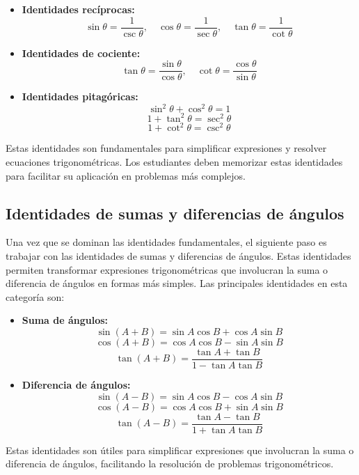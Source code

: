 \begin{itemize}
    \item \textbf{Identidades recíprocas:}
    \[
    \sin \theta = \frac{1}{\csc \theta}, \quad \cos \theta = \frac{1}{\sec \theta}, \quad \tan \theta = \frac{1}{\cot \theta}
    \]

    \item \textbf{Identidades de cociente:}
    \[
    \tan \theta = \frac{\sin \theta}{\cos \theta}, \quad \cot \theta = \frac{\cos \theta}{\sin \theta}
    \]

    \item \textbf{Identidades pitagóricas:}
    \[
    \sin^2 \theta + \cos^2 \theta = 1
    \]
    \[
    1 + \tan^2 \theta = \sec^2 \theta
    \]
    \[
    1 + \cot^2 \theta = \csc^2 \theta
    \]
\end{itemize}

Estas identidades son fundamentales para simplificar expresiones y resolver ecuaciones trigonométricas. Los estudiantes deben memorizar estas identidades para facilitar su aplicación en problemas más complejos.

\subsection{Identidades de sumas y diferencias de ángulos}

Una vez que se dominan las identidades fundamentales, el siguiente paso es trabajar con las identidades de sumas y diferencias de ángulos. Estas identidades permiten transformar expresiones trigonométricas que involucran la suma o diferencia de ángulos en formas más simples. Las principales identidades en esta categoría son:

\begin{itemize}
    \item \textbf{Suma de ángulos:}
    \[
    \sin (A + B) = \sin A \cos B + \cos A \sin B
    \]
    \[
    \cos (A + B) = \cos A \cos B - \sin A \sin B
    \]
    \[
    \tan (A + B) = \frac{\tan A + \tan B}{1 - \tan A \tan B}
    \]

    \item \textbf{Diferencia de ángulos:}
    \[
    \sin (A - B) = \sin A \cos B - \cos A \sin B
    \]
    \[
    \cos (A - B) = \cos A \cos B + \sin A \sin B
    \]
    \[
    \tan (A - B) = \frac{\tan A - \tan B}{1 + \tan A \tan B}
    \]
\end{itemize}

Estas identidades son útiles para simplificar expresiones que involucran la suma o diferencia de ángulos, facilitando la resolución de problemas trigonométricos.

